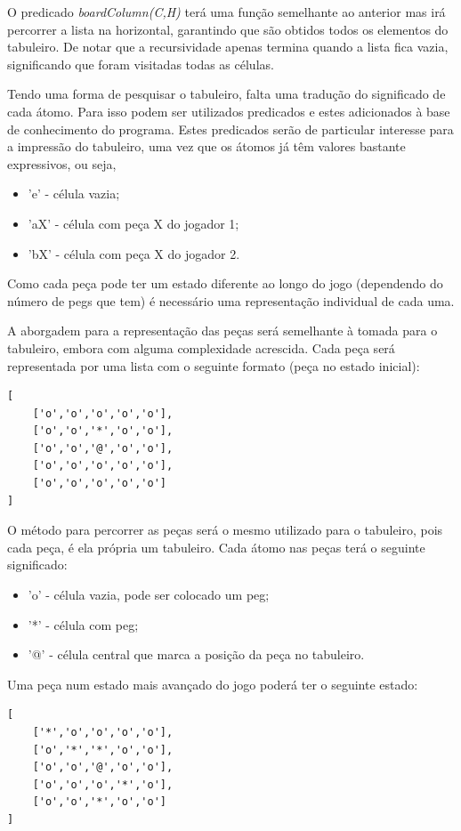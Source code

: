 \documentclass[paper=a4, fontsize=11pt]{scrartcl} %
\numberwithin{equation}{section} %
\numberwithin{figure}{section} %
\numberwithin{table}{section} %
\begin{document}
O predicado \emph{boardColumn(C,H)} terá uma função semelhante ao anterior mas irá percorrer a lista na horizontal, garantindo que são obtidos todos os elementos do tabuleiro. De notar que a recursividade apenas termina quando a lista fica vazia, significando que foram visitadas todas as células.

Tendo uma forma de pesquisar o tabuleiro, falta uma tradução do significado de cada átomo. Para isso podem ser utilizados predicados e estes adicionados à base de conhecimento do programa.  Estes predicados serão de particular interesse para a impressão do tabuleiro, uma vez que os átomos já têm valores bastante expressivos, ou seja,

\begin{itemize}
	\item 'e' -  célula vazia;
	\item 'aX' - célula com peça X do jogador 1;
	\item 'bX' - célula com peça X do jogador 2.
\end{itemize}

Como cada peça pode ter um estado diferente ao longo do jogo (dependendo do número de pegs que tem) é necessário uma representação individual de cada uma.

A aborgadem para a representação das peças será semelhante à tomada para o tabuleiro, embora com alguma complexidade acrescida. Cada peça será representada por uma lista com o seguinte formato (peça no estado inicial):

\begin{lstlisting}
[
	['o','o','o','o','o'],
	['o','o','*','o','o'],
	['o','o','@','o','o'],
	['o','o','o','o','o'],
	['o','o','o','o','o']
]
\end{lstlisting}

O método para percorrer as peças será o mesmo utilizado para o tabuleiro, pois cada peça, é ela própria um tabuleiro. Cada átomo nas peças terá o seguinte significado:

\begin{itemize}
	\item 'o' -  célula vazia, pode ser colocado um peg;
	\item '*' - célula com peg;
	\item '@' - célula central que marca a posição da peça no tabuleiro.
\end{itemize}

Uma peça num estado mais avançado do jogo poderá ter o seguinte estado:

\begin{lstlisting}
[
	['*','o','o','o','o'],
	['o','*','*','o','o'],
	['o','o','@','o','o'],
	['o','o','o','*','o'],
	['o','o','*','o','o']
]
\end{lstlisting}
\end{document}
